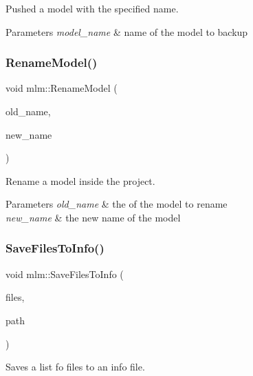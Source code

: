 Pushed a model with the specified name. 


\begin{DoxyParams}{Parameters}
{\em model\+\_\+name} & name of the model to backup \\
\hline
\end{DoxyParams}
\mbox{\label{namespacemlm_a93971c6e67082f90b5696972b12dee89}} 
\subsubsection{\texorpdfstring{Rename\+Model()}{RenameModel()}}
{\footnotesize\ttfamily void mlm\+::\+Rename\+Model (\begin{DoxyParamCaption}\item[{std\+::string const \&}]{old\+\_\+name,  }\item[{std\+::string const \&}]{new\+\_\+name }\end{DoxyParamCaption})}



Rename a model inside the project. 


\begin{DoxyParams}{Parameters}
{\em old\+\_\+name} & the of the model to rename \\
\hline
{\em new\+\_\+name} & the new name of the model \\
\hline
\end{DoxyParams}
\mbox{\label{namespacemlm_a5cf15b46d858778a1cfcc8905de90782}} 
\subsubsection{\texorpdfstring{Save\+Files\+To\+Info()}{SaveFilesToInfo()}}
{\footnotesize\ttfamily void mlm\+::\+Save\+Files\+To\+Info (\begin{DoxyParamCaption}\item[{std\+::list$<$ \mbox{\hyperlink{structmlm_1_1fileType}{file\+Type}} $>$ const \&}]{files,  }\item[{std\+::string const \&}]{path }\end{DoxyParamCaption})}



Saves a list fo files to an info file. 


